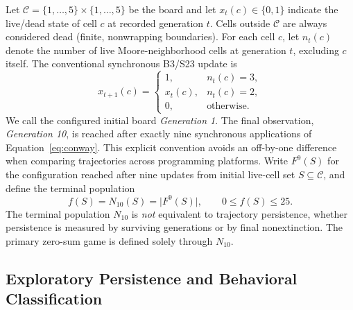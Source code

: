 \documentclass[games,article,submit,moreauthors]{Definitions/mdpi}
\begin{document}
Let $\mathcal{C}=\{1,\ldots,5\}\times\{1,\ldots,5\}$ be the board and let $x_t(c)\in\{0,1\}$ indicate the live/dead state of cell $c$ at recorded generation $t$. Cells outside $\mathcal{C}$ are always considered dead (finite, nonwrapping boundaries). For each cell $c$, let $n_t(c)$ denote the number of live Moore-neighborhood cells at generation $t$, excluding $c$ itself. The conventional synchronous B3/S23 update is
\begin{equation}\label{eq:conway}
x_{t+1}(c)=
\begin{cases}
1, & n_t(c)=3,\\
x_t(c), & n_t(c)=2,\\
0, & \text{otherwise.}
\end{cases}
\end{equation}
We call the configured initial board \emph{Generation 1}. The final observation, \emph{Generation 10}, is reached after exactly nine synchronous applications of Equation~\eqref{eq:conway}. This explicit convention avoids an off-by-one difference when comparing trajectories across programming platforms. Write $F^{9}(S)$ for the configuration reached after nine updates from initial live-cell set $S\subseteq\mathcal{C}$, and define the terminal population
\begin{equation}\label{eq:outcome}
f(S)=N_{10}(S)=\bigl|F^{9}(S)\bigr|,\qquad 0\leq f(S)\leq25.
\end{equation}
The terminal population $N_{10}$ is \emph{not} equivalent to trajectory persistence, whether persistence is measured by surviving generations or by final nonextinction. The primary zero-sum game is defined solely through $N_{10}$.

\subsection{Exploratory Persistence and Behavioral Classification}
\end{document}
